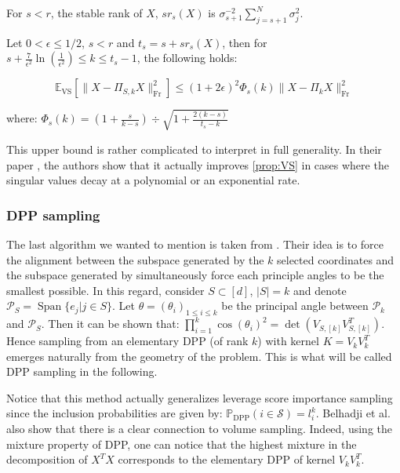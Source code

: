 \begin{proposition} 
    For $s< r$, the stable rank of $X$, $sr_s(X)$ is $\sigma_{s+1}^{-2} \sum \limits_{j = s+1}^N \sigma_j ^2$. 

    Let $0< \epsilon \leq 1/2$, $s<r$ and $t_s = s + sr_s(X)$, then for $ s + \frac{7}{\epsilon^2} \ln(\frac{1}{\epsilon^2}) \leq k \leq t_s -1 $, the following holds:

    \[\mathbb{E}_{\operatorname{VS}} [\lVert X - \Pi_{S,k}X \rVert_{\operatorname{Fr}}^2] \leq (1 +2\epsilon)^2 \Phi_s(k) \lVert X - \Pi_{k}X \rVert_{\operatorname{Fr}}^2 \]

    where: $\Phi_s(k) = (1+ \frac{s}{k-s}) ÷ \sqrt{1 + \frac{2(k-s)}{t_s - k }}$

\end{proposition}

This upper bound is rather complicated to interpret in full generality. In their paper \cite{derezinski_improved_2021}, the authors show that it actually improves \ref{prop:VS} in cases where the singular values decay at a polynomial or an exponential rate.

\subsubsection{DPP sampling} 

The last algorithm we wanted to mention is taken from \cite{belhadji_determinantal_2020}. Their idea is to force the alignment between the subspace generated by the $k$ selected coordinates and the subspace generated by simultaneously force each principle angles to be the smallest possible.
In this regard, consider $S \subset [d]$, $\lvert S \rvert = k$ and denote $\mathcal{P}_S = \operatorname{Span} \{e_j | j \in S \}$. Let $\mathbb{\theta} = (\theta_i)_{1 \leq i \leq k}$ be the principal angle between $ \mathcal{P}_k$ and $\mathcal{P}_S$. Then it can be shown that: $\prod \limits_{i =1}^k \cos(\theta_i)^2 = \det(V_{S,[k]} V_{S,[k]}^T)$.
Hence sampling from an elementary DPP (of rank $k$) with kernel $K = V_k V_k^T$ emerges naturally from the geometry of the problem. This is what will be called DPP sampling in the following. 

Notice that this method actually generalizes leverage score importance sampling since the inclusion probabilities are given by: $\mathbb{P}_{\operatorname{DPP}}(i \in \mathcal{S}) = l_i^k $.
Belhadji et al. also show that there is a clear connection to volume sampling. Indeed, using the mixture property of DPP, one can notice that the highest mixture in the decomposition of $X^T X$ corresponds to the elementary DPP of kernel $V_k V_k^T$.

